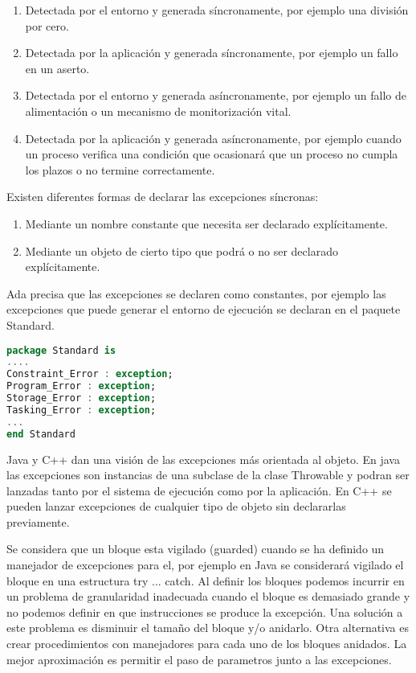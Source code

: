 \begin{enumerate}
	\item Detectada por el entorno y generada síncronamente, por ejemplo una
		división por cero.
	\item Detectada por la aplicación y generada síncronamente, por ejemplo
		un fallo en un aserto.
	\item Detectada por el entorno y generada asíncronamente, por ejemplo un
		fallo de alimentación o un mecanismo de monitorización vital.
	\item Detectada por la aplicación y generada asíncronamente, por ejemplo
		cuando un proceso verifica una condición que ocasionará que un
		proceso no cumpla los plazos o no termine correctamente.
\end{enumerate}

Existen diferentes formas de declarar las excepciones síncronas:

\begin{enumerate}
	\item Mediante un nombre constante que necesita ser declarado
		explícitamente.
	\item Mediante un objeto de cierto tipo que podrá o no ser declarado
		explícitamente.
\end{enumerate}

Ada precisa que las excepciones se declaren como constantes, por ejemplo las
excepciones que puede generar el entorno de ejecución se declaran en el paquete
Standard.

\begin{lstlisting}[language=ADA]
package Standard is
....
Constraint_Error : exception;
Program_Error : exception;
Storage_Error : exception;
Tasking_Error : exception;
...
end Standard
\end{lstlisting}

Java y C++ dan una visión de las excepciones más orientada al objeto. En java
las excepciones son instancias de una subclase de la clase Throwable y podran
ser lanzadas tanto por el sistema de ejecución como por la aplicación. En C++ se
pueden lanzar excepciones de cualquier tipo de objeto sin declararlas
previamente.

Se considera que un bloque esta vigilado (guarded) cuando se ha definido un
manejador de excepciones para el, por ejemplo en Java se considerará vigilado el
bloque en una estructura try ... catch. Al definir los bloques podemos incurrir
en un problema de granularidad inadecuada cuando el bloque es demasiado grande y
no podemos definir en que instrucciones se produce la excepción. Una solución a
este problema es disminuir el tamaño del bloque y/o anidarlo. Otra alternativa
es crear procedimientos con manejadores para cada uno de los bloques anidados.
La mejor aproximación es permitir el paso de parametros junto a las excepciones.


